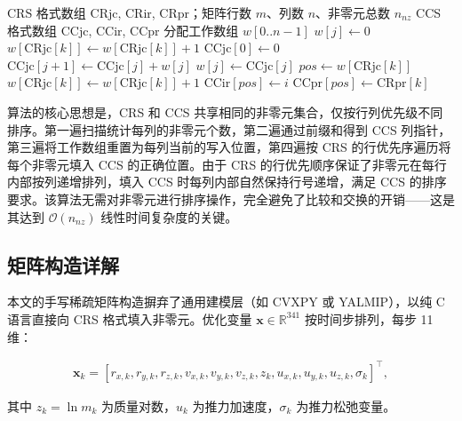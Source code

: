 \begin{algorithm}[htbp]
\caption{CRS 到 CCS 格式转换}
\label{alg:crs2ccs}
\begin{algorithmic}[1]
\Require CRS 格式数组 CRjc, CRir, CRpr；矩阵行数 $m$、列数 $n$、非零元总数 $n_{nz}$
\Ensure CCS 格式数组 CCjc, CCir, CCpr
\Statex
\State 分配工作数组 $w[0..n-1]$
    \State $w[j] \gets 0$
\EndFor
{}
    \State $w[\text{CRjc}[k]] \gets w[\text{CRjc}[k]] + 1$
\EndFor
\Statex
{}
\State $\text{CCjc}[0] \gets 0$
    \State $\text{CCjc}[j+1] \gets \text{CCjc}[j] + w[j]$
\EndFor
\Statex
{}
    \State $w[j] \gets \text{CCjc}[j]$
\EndFor
\Statex
{}
        \State $pos \gets w[\text{CRjc}[k]]$
        \State $w[\text{CRjc}[k]] \gets w[\text{CRjc}[k]] + 1$
        \State $\text{CCir}[pos] \gets i$
        \State $\text{CCpr}[pos] \gets \text{CRpr}[k]$
    \EndFor
\EndFor
\end{algorithmic}
\end{algorithm}

算法的核心思想是，CRS 和 CCS 共享相同的非零元集合，仅按行列优先级不同排序。第一遍扫描统计每列的非零元个数，第二遍通过前缀和得到 CCS 列指针，第三遍将工作数组重置为每列当前的写入位置，第四遍按 CRS 的行优先序遍历将每个非零元填入 CCS 的正确位置。由于 CRS 的行优先顺序保证了非零元在每行内部按列递增排列，填入 CCS 时每列内部自然保持行号递增，满足 CCS 的排序要求。该算法无需对非零元进行排序操作，完全避免了比较和交换的开销——这是其达到 $\mathcal{O}(n_{nz})$ 线性时间复杂度的关键。

\subsection{矩阵构造详解}

本文的手写稀疏矩阵构造摒弃了通用建模层（如 CVXPY 或 YALMIP），以纯 C 语言直接向 CRS 格式填入非零元。优化变量 $\bm{x} \in \mathbb{R}^{341}$ 按时间步排列，每步 11 维：

\begin{align}
\bm{x}_k = [r_{x,k}, r_{y,k}, r_{z,k}, v_{x,k}, v_{y,k}, v_{z,k}, z_k, u_{x,k}, u_{y,k}, u_{z,k}, \sigma_k]^{\top},
\end{align}

其中 $z_k = \ln m_k$ 为质量对数，$u_k$ 为推力加速度，$\sigma_k$ 为推力松弛变量。

